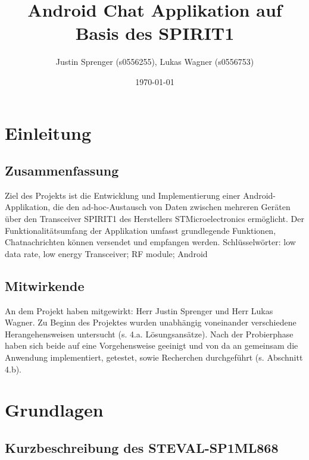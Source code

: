 \documentclass[a4paper, 12.5pt]{scrartcl}
\begin{document}
\begin{titlepage}
\author{Justin Sprenger (s0556255), 
Lukas Wagner (s0556753)} 
\title{Android Chat Applikation auf Basis des SPIRIT1} 
\date{\today} 
\maketitle
\end{titlepage}

\tableofcontents
\newpage
\section{Einleitung}
\subsection{Zusammenfassung}

Ziel des Projekts ist die Entwicklung und Implementierung einer Android-Applikation, die den ad-hoc-Austausch von Daten zwischen mehreren Geräten über den Transceiver SPIRIT1 des Herstellers STMicroelectronics ermöglicht.  Der Funktionalitätsumfang der Applikation umfasst grundlegende Funktionen, Chatnachrichten können versendet und empfangen werden. 
Schlüsselwörter: low data rate, low energy Transceiver; RF module; Android

\subsection{Mitwirkende}

An dem Projekt haben mitgewirkt: Herr Justin Sprenger und Herr Lukas Wagner. Zu Beginn des Projektes wurden unabhängig voneinander verschiedene Herangehensweisen untersucht (s. 4.a. Lösungsansätze). Nach der Probierphase haben sich beide auf eine Vorgehensweise geeinigt und von da an gemeinsam die Anwendung implementiert, getestet, sowie Recherchen durchgeführt (s. Abschnitt 4.b).
\section{Grundlagen}

\subsection{Kurzbeschreibung des STEVAL-SP1ML868}
\end{document}
